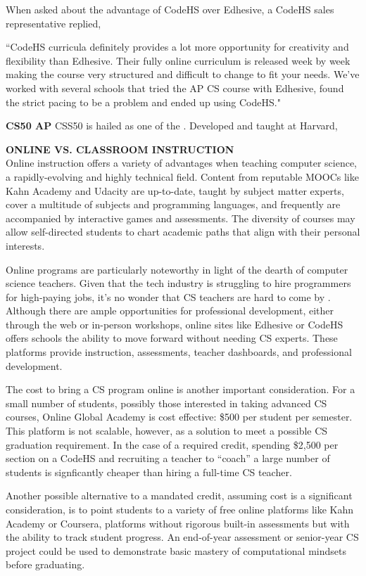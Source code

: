 When asked about the advantage of CodeHS over Edhesive, a CodeHS sales representative replied,
\begin{blockquote}
	``CodeHS curricula definitely provides a lot more opportunity for creativity and flexibility than Edhesive. Their fully online curriculum is released week by week making the course very structured and difficult to change to fit your needs. We've worked with several schools that tried the AP CS course with Edhesive, found the strict pacing to be a problem and ended up using CodeHS."
\end{blockquote}

\textbf{CS50 AP}
CSS50 is hailed as one of the . Developed and taught at Harvard, 





\textbf{ONLINE VS. CLASSROOM INSTRUCTION} \\
Online instruction offers a variety of advantages when teaching computer science, a rapidly-evolving and highly technical field. Content from reputable MOOCs like Kahn Academy and Udacity are up-to-date, taught by subject matter experts, cover a multitude of subjects and programming languages, and frequently are accompanied by interactive games and assessments. The diversity of courses may allow self-directed students to chart academic paths that align with their personal interests. \par
Online programs are particularly noteworthy in light of the dearth of computer science teachers. Given that the tech industry is struggling to hire programmers for high-paying jobs, it's no wonder that CS teachers are hard to come by \cite{washpostcs}. Although there are ample opportunities for professional development, either through the web or in-person workshops, online sites like Edhesive or CodeHS offers schools the ability to move forward without needing CS experts. These platforms provide instruction, assessments, teacher dashboards, and professional development.\par
The cost to bring a CS program online is another important consideration. For a small number of students, possibly those interested in taking advanced CS courses, Online Global Academy is cost effective: \$500 per student per semester. This platform is not scalable, however, as a solution to meet a possible CS graduation requirement. In the case of a required credit, spending \$2,500 per section on a CodeHS and recruiting a teacher to ``coach'' a large number of students is signficantly cheaper than hiring a full-time CS teacher. \par
Another possible alternative to a mandated credit, assuming cost is a significant consideration, is to point students to a variety of free online platforms like Kahn Academy or Coursera, platforms without rigorous built-in assessments but with the ability to track student progress. An end-of-year assessment or senior-year CS project could be used to demonstrate basic mastery of computational mindsets before graduating. \par



